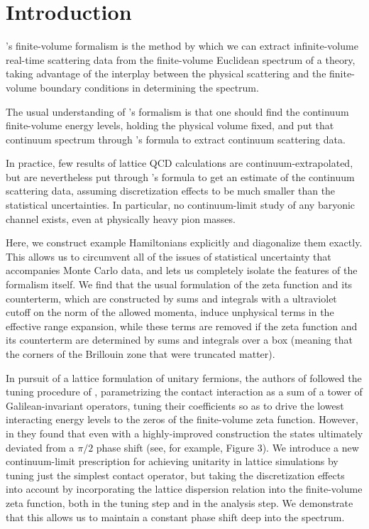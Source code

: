 \section{Introduction}\label{sec:intro}

\Luscher's finite-volume formalism\cite{Hamber198399,luscher:1986I,luscher:1986II,wiese1989,Luscher1991,Luscher1991237} is the method by which we can extract infinite-volume real-time scattering data from the finite-volume Euclidean spectrum of a theory, taking advantage of the interplay between the physical scattering and the finite-volume boundary conditions in determining the spectrum.

The usual understanding of \Luscher's formalism is that one should find the continuum finite-volume energy levels, holding the physical volume fixed, and put that continuum spectrum through \Luscher's formula to extract continuum scattering data.

In practice, few results of lattice QCD calculations are continuum-extrapolated, but are nevertheless put through \Luscher's formula to get an estimate of the continuum scattering data, assuming discretization effects to be much smaller than the statistical uncertainties.
In particular, no continuum-limit study of any baryonic channel exists, even at physically heavy pion masses.

Here, we construct example Hamiltonians explicitly and diagonalize them exactly.
This allows us to circumvent all of the issues of statistical uncertainty that accompanies Monte Carlo data, and lets us completely isolate the features of the formalism itself.
We find that the usual formulation of the \Luscher zeta function and its counterterm, which are constructed by sums and integrals with a ultraviolet cutoff on the norm of the allowed momenta, induce unphysical terms in the effective range expansion, while these terms are removed if the zeta function and its counterterm are determined by sums and integrals over a box (meaning that the corners of the Brillouin zone that were truncated matter).

In pursuit of a lattice formulation of unitary fermions, the authors of  followed the tuning procedure of , parametrizing the contact interaction as a sum of a tower of Galilean-invariant operators, tuning their coefficients so as to drive the lowest interacting energy levels to the zeros of the \Luscher finite-volume zeta function.
However, in  they found that even with a highly-improved construction the states ultimately deviated from a $\pi/2$ phase shift (see, for example, Figure 3).
We introduce a new continuum-limit prescription for achieving unitarity in lattice simulations by tuning just the simplest contact operator, but taking the discretization effects into account by incorporating the lattice dispersion relation into the finite-volume zeta function, both in the tuning step and in the analysis step.
We demonstrate that this allows us to maintain a constant phase shift deep into the spectrum.


